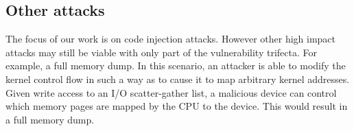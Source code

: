 \subsection{Other attacks}
The focus of our work is on code injection attacks. 
However other high impact attacks may still be viable with only part of the vulnerability trifecta. 
For example, a full memory dump.
In this scenario, an attacker is able to modify the kernel control flow in such a way as to cause it to map arbitrary kernel addresses. Given write access to an I/O scatter-gather list, a malicious device can control which memory pages are mapped by the CPU to the device. This would result in a full memory dump.

